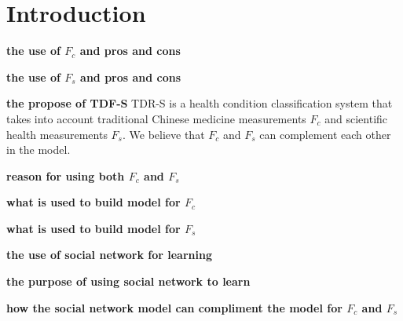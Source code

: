 \section{Introduction}
{\bf the use of $F_c$ and pros and cons}


{\bf the use of $F_s$ and pros and cons}

{\bf the propose of TDF-S}
TDR-S is a health condition classification system that takes into account 
traditional Chinese medicine measurements $F_c$ and scientific health measurements $F_s$. 
We believe that $F_c$ and $F_s$ can complement each other in the model. 

{\bf reason for using both $F_c$ and $F_s$}

{\bf what is used to build model for $F_c$}

{\bf what is used to build model for $F_s$}

{\bf the use of social network for learning}

{\bf the purpose of using social network to learn}

{\bf how the social network model can compliment the model for $F_c$ and $F_s$}






